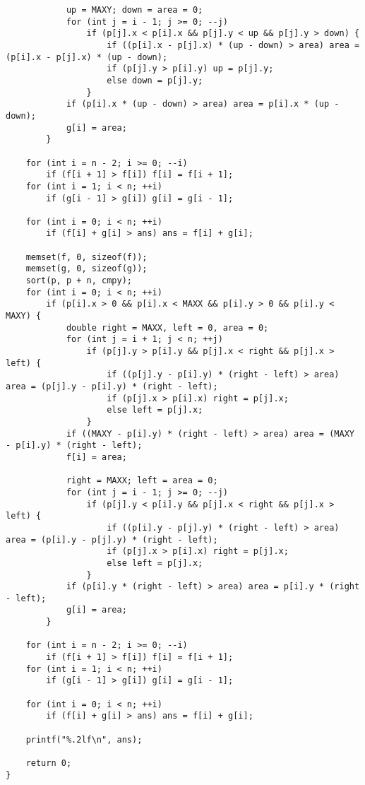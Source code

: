 \begin{verbatim}
			up = MAXY; down = area = 0;
			for (int j = i - 1; j >= 0; --j)
				if (p[j].x < p[i].x && p[j].y < up && p[j].y > down) {
					if ((p[i].x - p[j].x) * (up - down) > area) area = (p[i].x - p[j].x) * (up - down);
					if (p[j].y > p[i].y) up = p[j].y;
					else down = p[j].y;
				}
			if (p[i].x * (up - down) > area) area = p[i].x * (up - down);
			g[i] = area;
		}

	for (int i = n - 2; i >= 0; --i)
		if (f[i + 1] > f[i]) f[i] = f[i + 1];
	for (int i = 1; i < n; ++i)
		if (g[i - 1] > g[i]) g[i] = g[i - 1];

	for (int i = 0; i < n; ++i)
		if (f[i] + g[i] > ans) ans = f[i] + g[i];

	memset(f, 0, sizeof(f));
	memset(g, 0, sizeof(g));
	sort(p, p + n, cmpy);
	for (int i = 0; i < n; ++i)
		if (p[i].x > 0 && p[i].x < MAXX && p[i].y > 0 && p[i].y < MAXY) {
			double right = MAXX, left = 0, area = 0;
			for (int j = i + 1; j < n; ++j)
				if (p[j].y > p[i].y && p[j].x < right && p[j].x > left) {
					if ((p[j].y - p[i].y) * (right - left) > area) area = (p[j].y - p[i].y) * (right - left);
					if (p[j].x > p[i].x) right = p[j].x;
					else left = p[j].x;
				}
			if ((MAXY - p[i].y) * (right - left) > area) area = (MAXY - p[i].y) * (right - left);
			f[i] = area;

			right = MAXX; left = area = 0;
			for (int j = i - 1; j >= 0; --j)
				if (p[j].y < p[i].y && p[j].x < right && p[j].x > left) {
					if ((p[i].y - p[j].y) * (right - left) > area) area = (p[i].y - p[j].y) * (right - left);
					if (p[j].x > p[i].x) right = p[j].x;
					else left = p[j].x;
				}
			if (p[i].y * (right - left) > area) area = p[i].y * (right - left);
			g[i] = area;
		}

	for (int i = n - 2; i >= 0; --i)
		if (f[i + 1] > f[i]) f[i] = f[i + 1];
	for (int i = 1; i < n; ++i)
		if (g[i - 1] > g[i]) g[i] = g[i - 1];

	for (int i = 0; i < n; ++i)
		if (f[i] + g[i] > ans) ans = f[i] + g[i];

	printf("%.2lf\n", ans);

	return 0;
}
\end{verbatim}
